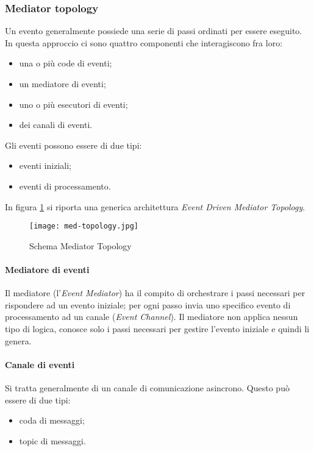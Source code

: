 \subsubsection{Mediator topology}
Un evento generalmente possiede una serie di passi ordinati per essere eseguito. In questa approccio ci sono quattro componenti che interagiscono fra loro:
\begin{itemize}
    \item una o più code di eventi;
    \item un mediatore di eventi;
    \item uno o più esecutori di eventi;
    \item dei canali di eventi.
\end{itemize}
    
Gli eventi possono essere di due tipi:
\begin{itemize}
    \item eventi iniziali;
    \item eventi di processamento.
\end{itemize}
    
In figura \ref{fig:eventdriver-med-top} si riporta una generica architettura \emph{Event Driven Mediator Topology}.   
\begin{figure}[htbp]
    \centering
    \texttt{[image: med-topology.jpg]} 
    \caption{Schema Mediator Topology}
    \label{fig:eventdriver-med-top} 
\end{figure}

\paragraph{Mediatore di eventi}
Il mediatore (l’\emph{Event Mediator}) ha il compito di orchestrare i passi necessari per rispondere ad un evento iniziale; per ogni passo invia uno specifico evento di processamento ad un canale (\emph{Event Channel}). Il mediatore non applica nessun tipo di logica, conosce solo i passi necessari per gestire l’evento iniziale e quindi li genera.
\paragraph{Canale di eventi}
Si tratta generalmente di un canale di comunicazione asincrono. Questo può essere di due tipi:
\begin{itemize}
    \item coda di messaggi;
    \item topic di messaggi.
\end{itemize}
